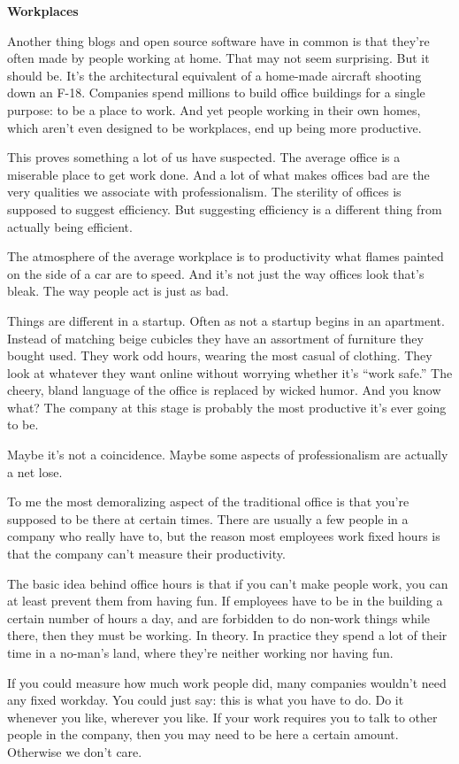 \documentclass[12pt]{book}
\begin{document}
\textbf{Workplaces}

Another thing blogs and open source software have in common is that
they're often made by people working at home. That may not seem
surprising. But it should be. It's the architectural equivalent of a
home-made aircraft shooting down an F-18. Companies spend millions to
build office buildings for a single purpose: to be a place to work. And
yet people working in their own homes, which aren't even designed to be
workplaces, end up being more productive.

This proves something a lot of us have suspected. The average office is
a miserable place to get work done. And a lot of what makes offices bad
are the very qualities we associate with professionalism. The sterility
of offices is supposed to suggest efficiency. But suggesting efficiency
is a different thing from actually being efficient.

The atmosphere of the average workplace is to productivity what flames
painted on the side of a car are to speed. And it's not just the way
offices look that's bleak. The way people act is just as bad.

Things are different in a startup. Often as not a startup begins in an
apartment. Instead of matching beige cubicles they have an assortment of
furniture they bought used. They work odd hours, wearing the most casual
of clothing. They look at whatever they want online without worrying
whether it's ``work safe.'' The cheery, bland language of the office is
replaced by wicked humor. And you know what? The company at this stage
is probably the most productive it's ever going to be.

Maybe it's not a coincidence. Maybe some aspects of professionalism are
actually a net lose.

To me the most demoralizing aspect of the traditional office is that
you're supposed to be there at certain times. There are usually a few
people in a company who really have to, but the reason most employees
work fixed hours is that the company can't measure their productivity.

The basic idea behind office hours is that if you can't make people
work, you can at least prevent them from having fun. If employees have
to be in the building a certain number of hours a day, and are forbidden
to do non-work things while there, then they must be working. In theory.
In practice they spend a lot of their time in a no-man's land, where
they're neither working nor having fun.

If you could measure how much work people did, many companies wouldn't
need any fixed workday. You could just say: this is what you have to do.
Do it whenever you like, wherever you like. If your work requires you to
talk to other people in the company, then you may need to be here a
certain amount. Otherwise we don't care.
\end{document}
